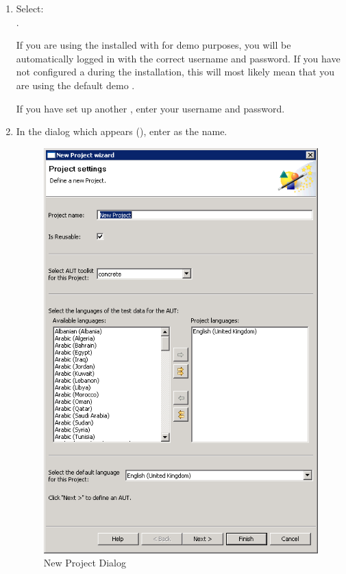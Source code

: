 \begin{enumerate}
\item Select:\\ . 

If you are using the \gddb{} installed with \app{} for demo purposes, you will be automatically logged in with the correct username and password. If you have not configured a \gddb{} during the installation, this will most likely mean that you are using the default demo \gddb{}. 

If you have set up another \gddb{}, enter your username and password.  

\item In the  dialog which appears (), enter 
 as the  \gdproject{} name. 

\begin{figure}[h]
\begin{center}
\includegraphics[width=12cm]{Tutorials/PS/TutNewProject}
\caption{New Project Dialog}
\label{TutNewProject}
\end{center}
\end{figure}



\end{enumerate}
